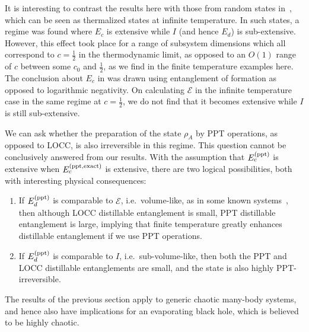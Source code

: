 \documentclass[a4paper,11pt]{article}
\newcommand\half{{\ensuremath{\frac{1}{2}}}}
\newcommand\ha{{\half}}
\newcommand\sE{{\ensuremath{{\mathcal E}}}}
\begin{document}
\begin{enumerate}
It is interesting to contrast the results here with those from random states in~\cite{hayden2006aspects}, which can be seen as thermalized states at infinite temperature. 
In such states, a regime was found where $E_c$ is extensive while $I$ (and hence $E_d$) is sub-extensive. However, this effect took place for a range of subsystem dimensions which all correspond to $c=\ha$ in the thermodynamic limit, as opposed to an $O(1)$ range of $c$ between some $c_0$ and $\ha$, as we find in the finite temperature examples here. The conclusion about $E_c$ in \cite{hayden2006aspects} was drawn using entanglement of formation as opposed to logarithmic negativity. On calculating $\sE$ in the infinite temperature case in the same regime at $c=\ha$, we do not find that it becomes extensive while $I$ is still sub-extensive. 



We can ask whether the preparation of the state $\rho_A$ by PPT operations, as opposed to LOCC, is also irreversible in this regime. This question cannot be conclusively answered from our results. With the assumption that $E_c^{\rm (ppt)}$ is extensive when $E_c^{\rm (ppt, exact)}$ is extensive, there are two logical possibilities, both with interesting physical consequences:
\begin{enumerate}

\item If $E_d^{\rm (ppt)}$ is comparable to $\sE$, i.e.~volume-like, as in some known systems~\cite{audenaert2003entanglement}, then although LOCC distillable entanglement is small, PPT distillable entanglement is large, implying that finite temperature greatly enhances distillable entanglement if we use PPT operations. 

 \item If $E_d^{\rm (ppt)}$ is comparable to $I$, i.e.~sub-volume-like, then both the PPT and LOCC distillable entanglements are small, and the state is also highly PPT-irreversible. 
 
\end{enumerate} 


The results of the previous section apply to generic chaotic many-body systems, and hence also have implications for an evaporating black hole, which is believed to be highly chaotic. 


\end{enumerate}
\end{document}
